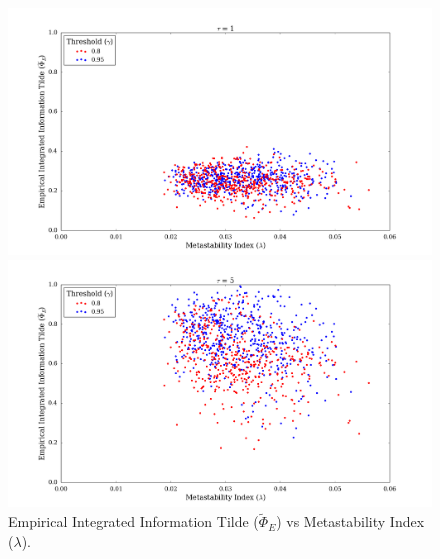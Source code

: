 \documentclass[a4paper,11pt]{article}
\begin{document}
\begin{figure}[H] 
	\begin{minipage}[b]{0.5\linewidth}
		\begin{center}
		\includegraphics[scale = 0.2]{figures/snn/phi_tilde_vs_lambda_1}
		\end{center}
		\vspace{4ex}
	\end{minipage}
	\begin{minipage}[b]{0.5\linewidth}
		\begin{center}
		\includegraphics[scale = 0.2]{figures/snn/phi_tilde_vs_lambda_5}
		\end{center}
		\vspace{4ex}
	\end{minipage}
	\caption{
		Empirical Integrated Information Tilde ($\widetilde{\Phi}_E$) vs Metastability Index ($\lambda$).
		\label{fig:phi_tilde_vs_lambda}
	}
\end{figure}
\end{document}
